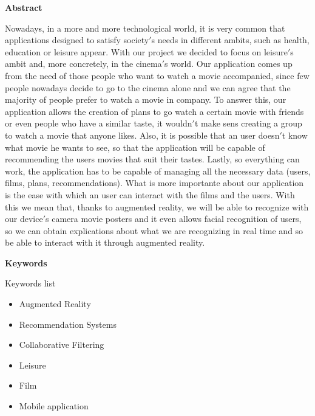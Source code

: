 
\newpage

\thispagestyle{empty}

\begin{center}

{\bf \Huge Abstract}

  \end{center}
\vspace{1cm}

Nowadays, in a more and more technological world, it is very common that applications designed to satisfy society$'$s needs in different ambits, such as health, education or leisure appear.
With our project we decided to focus on leisure$'$s ambit and, more concretely, in the cinema$'$s world.
Our application comes up from the need of those people who want to watch a movie accompanied, since few people nowadays decide to go to the cinema alone and we can agree that the majority of people prefer to watch a movie in company.
To answer this, our application allows the creation of plans to go watch a certain movie with friends or even people who have a similar taste, it wouldn$'$t make sens creating a group to watch a movie
that anyone likes. Also, it is possible that an user doesn$'$t know what movie he wants to see, so that the application will be capable of recommending the users movies that
suit their tastes. Lastly, so everything can work, the application has to be capable of managing all the necessary data (users, films, plans, recommendations).
What is more importante about our application is the ease with which an user can interact with the films and the users. With this we mean that, thanks to augmented reality, we will be able to recognize with our device$'$s camera movie posters and it even
allows facial recognition of users, so we can obtain explications about what we are recognizing in real time and so be able to interact with it through augmented reality.

\vspace{1cm}

\begin{center}

  {\bf \Large Keywords}
  
     \end{center}
  
     \vspace{0.5cm}
     
     Keywords list
     \begin{itemize}  
      \item Augmented Reality
      \item Recommendation Systems
      \item Collaborative Filtering
      \item Leisure
      \item Film
      \item Mobile application
    \end{itemize}
   


